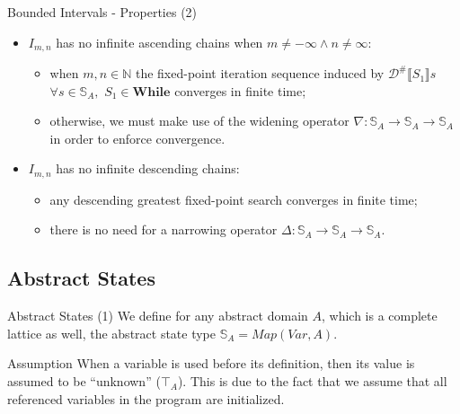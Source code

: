 \begin{frame}{Bounded Intervals - Properties (2)}
    \begin{itemize}
        \item $I_{m,n}$ has no infinite ascending chains when $m \neq -\infty \land n \neq \infty$:
        \begin{itemize}
            \item when $m,n\in \mathbb{N}$ the fixed-point iteration sequence induced by $\mathcal{D}^{\#}\llbracket S_1 \rrbracket s$ $\forall s \in \mathbb{S}_A,\,\,S_1 \in \textbf{While}$ converges in finite time;
            \item otherwise, we must make use of the widening operator $\nabla: \mathbb{S}_A \to \mathbb{S}_A \to\mathbb{S}_A$ in order to enforce convergence. 
        \end{itemize}
        \item $I_{m,n}$ has no infinite descending chains:
        \begin{itemize}
            \item any descending greatest fixed-point search converges in finite time;
            \item there is no need for a narrowing operator $\Delta: \mathbb{S}_A \to \mathbb{S}_A \to\mathbb{S}_A$.
        \end{itemize}
    \end{itemize}
    
\end{frame}

\subsection{Abstract States}

\begin{frame}{Abstract States (1)}
    We define for any abstract domain $A$, which is a complete lattice as well, the abstract state type $\mathbb{S}_{A} = Map(Var, A)$.
    
    \begin{alertblock}{Assumption}
        When a variable is used before its definition, then its value is assumed to be ``unknown'' ($\top_{A}$). This is due to the fact that we assume that all referenced variables in the program are initialized.
    \end{alertblock}
\end{frame}

